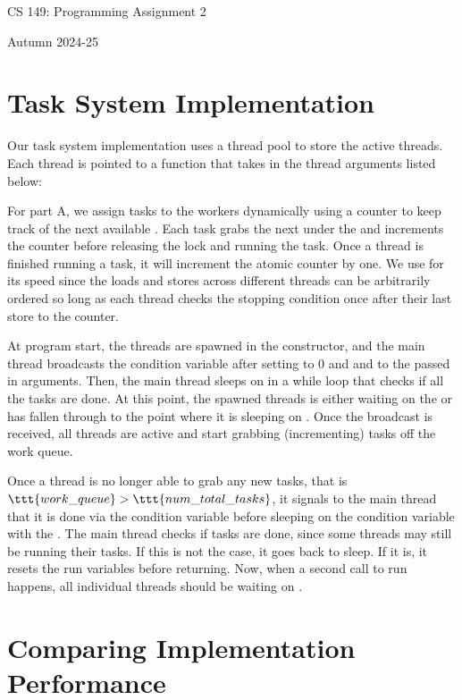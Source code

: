 \documentclass[11pt]{article}
\begin{document}
\lstset{language=C++,basicstyle=\footnotesize\ttfamily,breaklines=true}

\fancyhf{}
\setlength{\headheight}{14pt}
\pagestyle{fancy}

\centerline{\Large CS 149: Programming Assignment 2}
\centerline{Autumn 2024-25}

\section{Task System Implementation}

Our task system implementation uses a thread pool to store the active threads.
Each thread is pointed to a  function that takes in the
thread arguments listed below:


For part A, we assign tasks to the workers dynamically using a 
counter to keep track of the next available . Each task grabs the
next  under the  and increments the counter
before releasing the lock and running the task. Once a thread is finished
running a task, it will increment the atomic  counter by one.
We use  for its speed since the loads and
stores across different threads can be arbitrarily ordered so long as each
thread checks the stopping condition once after their last store to the counter.

At program start, the threads are spawned in the constructor, and the main
thread broadcasts the  condition variable after setting
 to 0 and  and  to the
passed in arguments. Then, the main thread sleeps on  in a while
loop that checks if all the tasks are done. At this point, the spawned threads
is either waiting on the  or has fallen through to the point
where it is sleeping on . Once the broadcast is received, all threads
are active and start grabbing (incrementing) tasks off the work queue.

Once a thread is no longer able to grab any new tasks, that is
$\ttt{work\_queue} > \ttt{num\_total\_tasks}$, it signals to the main thread that
it is done via the  condition variable before sleeping on the
 condition variable with the . The main thread checks
if  tasks are done, since some threads may still be running their
tasks. If this is not the case, it goes back to sleep. If it is, it resets the
run variables before returning. Now, when a second call to run happens, all
individual threads should be waiting on .
% 

\section{Comparing Implementation Performance}
\end{document}
